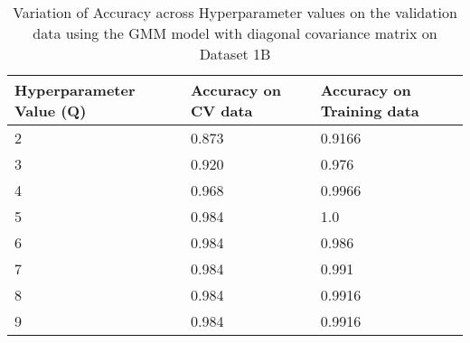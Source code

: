 \begin{table}[H]
\centering
\begin{tabular}{l l l }
\hline
\hline
\textbf{Hyperparameter Value (Q)} &  \textbf{Accuracy on CV data} &  \textbf{Accuracy on Training data}  \\
\hline
\hline
2 & 0.873 & 0.9166\\
3 & 0.920 & 0.976\\
4 & 0.968 & 0.9966\\
5 & 0.984 & 1.0\\
6 & 0.984 & 0.986\\
7 & 0.984 & 0.991\\
8 & 0.984 & 0.9916\\
9 & 0.984 & 0.9916\\
\hline
\end{tabular}
\caption{Variation of Accuracy across Hyperparameter values on the validation data using the GMM model with diagonal covariance matrix on Dataset 1B}
\label{tab:cv1b}
\end{table}

